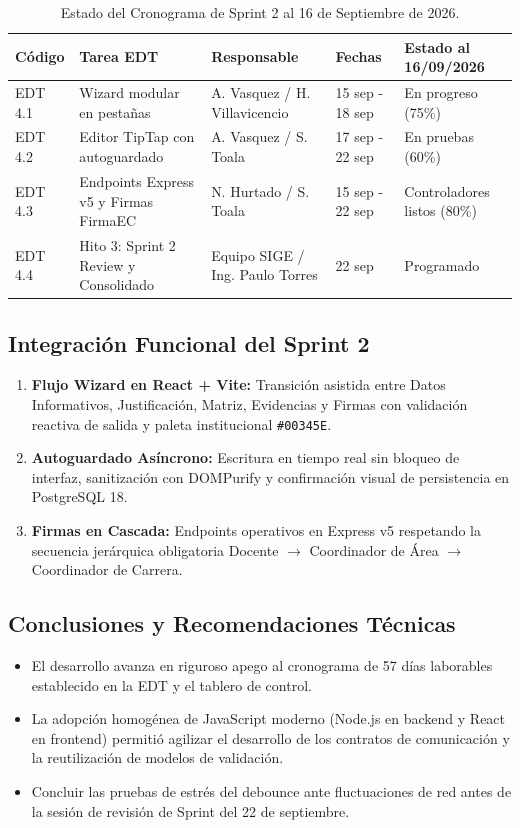 \documentclass[12pt,a4paper]{article}
\begin{document}
\begin{table}[htbp]
\centering
\small
\renewcommand{\arraystretch}{1.2}
\begin{tabularx}{\textwidth}{|l|X|l|l|l|}
\hline
\rowcolor{tableheader}
\textbf{Código} & \textbf{Tarea EDT} & \textbf{Responsable} & \textbf{Fechas} & \textbf{Estado al 16/09/2026} \\
\hline
EDT 4.1 & Wizard modular en pestañas & A. Vasquez / H. Villavicencio & 15 sep - 18 sep & En progreso (75\%) \\
\hline
EDT 4.2 & Editor TipTap con autoguardado & A. Vasquez / S. Toala & 17 sep - 22 sep & En pruebas (60\%) \\
\hline
EDT 4.3 & Endpoints Express v5 y Firmas FirmaEC & N. Hurtado / S. Toala & 15 sep - 22 sep & Controladores listos (80\%) \\
\hline
EDT 4.4 & Hito 3: Sprint 2 Review y Consolidado & Equipo SIGE / Ing. Paulo Torres & 22 sep & Programado \\
\hline
\end{tabularx}
\caption{Estado del Cronograma de Sprint 2 al 16 de Septiembre de 2026.}
\end{table}

\subsection{Integración Funcional del Sprint 2}
\begin{enumerate}[leftmargin=1.5em, itemsep=2pt]
    \item \textbf{Flujo Wizard en React + Vite:} Transición asistida entre Datos Informativos, Justificación, Matriz, Evidencias y Firmas con validación reactiva de salida y paleta institucional \texttt{\#00345E}.
    \item \textbf{Autoguardado Asíncrono:} Escritura en tiempo real sin bloqueo de interfaz, sanitización con DOMPurify y confirmación visual de persistencia en PostgreSQL 18.
    \item \textbf{Firmas en Cascada:} Endpoints operativos en Express v5 respetando la secuencia jerárquica obligatoria Docente $\rightarrow$ Coordinador de Área $\rightarrow$ Coordinador de Carrera.
\end{enumerate}

\subsection{Conclusiones y Recomendaciones Técnicas}
\begin{itemize}[leftmargin=1.5em, itemsep=2pt]
    \item El desarrollo avanza en riguroso apego al cronograma de 57 días laborables establecido en la EDT y el tablero de control.
    \item La adopción homogénea de JavaScript moderno (Node.js en backend y React en frontend) permitió agilizar el desarrollo de los contratos de comunicación y la reutilización de modelos de validación.
    \item Concluir las pruebas de estrés del debounce ante fluctuaciones de red antes de la sesión de revisión de Sprint del 22 de septiembre.
\end{itemize}
\end{document}
